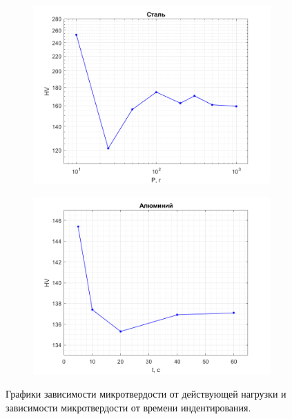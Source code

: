\documentclass[12pt, a4paper]{article}
\begin{document}
    \begin{figure}[h!]
        \centering
        \begin{subfigure}{\textwidth}
            \centering
            \includegraphics[width = 14cm]{figure_1.png}
        \end{subfigure}
        \begin{subfigure}{\textwidth}
            \centering
            \includegraphics[width = 14cm]{figure_2.png}
        \end{subfigure}
        \caption{\centering Графики зависимости микротвердости от действующей нагрузки и зависимости микротвердости от времени индентирования.}
        \label{fig1}
    \end{figure}
    
\end{document}
